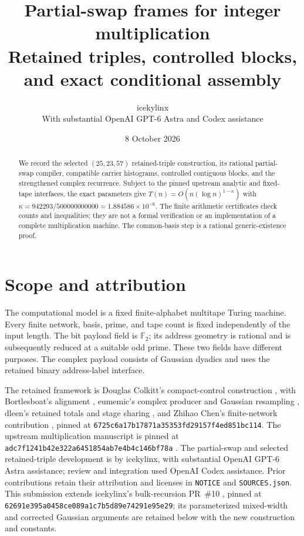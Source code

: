 \documentclass[11pt]{article}
\title{Partial-swap frames for integer multiplication\\
\large Retained triples, controlled blocks, and exact conditional assembly}
\author{icekylinx\\\small With substantial OpenAI GPT-6 Astra and Codex assistance}
\date{8 October 2026}
\begin{document}
\maketitle
\begin{abstract}
We record the selected $(25,23,57)$ retained-triple construction, its
rational partial-swap compiler, compatible carrier histograms, controlled
contiguous blocks, and the strengthened complex recurrence. Subject to the
pinned upstream analytic and fixed-tape interfaces, the exact parameters give
$T(n)=O(n(\log n)^{1-\kappa})$ with
$\kappa=942293/500000000000=1.884586\times10^{-6}$.
The finite arithmetic certificates check counts and inequalities; they are
not a formal verification or an implementation of a complete multiplication
machine. The common-basis step is a rational generic-existence proof.
\end{abstract}

\section{Scope and attribution}
The computational model is a fixed finite-alphabet multitape Turing machine.
Every finite network, basis, prime, and tape count is fixed independently of
the input length. The bit payload field is $\mathbb F_2$; its address
geometry is rational and is subsequently reduced at a suitable odd prime.
These two fields have different purposes. The complex payload consists of
Gaussian dyadics and uses the retained binary address-label interface.

The retained framework is Douglas Colkitt's compact-control construction
\cite{main}, with Bortlesboat's alignment \cite{pr2}, eumemic's complex
producer and Gaussian resampling \cite{pr3,pr5,pr6}, dleen's retained totals
and stage sharing \cite{pr4}, and Zhihao Chen's finite-network contribution
\cite{pr7}, pinned at
\texttt{6725c6a17b17871a35353fd29157f4ed851bc114}.
The upstream multiplication manuscript is pinned at
\texttt{adc7f1241b42e322a6451854ab7e4b4c146bf78a} \cite{upstream}.
The partial-swap and selected retained-triple development is by icekylinx,
with substantial OpenAI GPT-6 Astra assistance; review and integration used
OpenAI Codex assistance. Prior contributions retain their attribution and
licenses in \texttt{NOTICE} and \texttt{SOURCES.json}.
This submission extends icekylinx's bulk-recursion PR~\#10 \cite{pr10},
pinned at \texttt{62691e395a0458ce089a1c7b5d89e74291e95e29}; its
parameterized mixed-width and corrected Gaussian arguments are retained
below with the new construction and constants.
\end{document}
